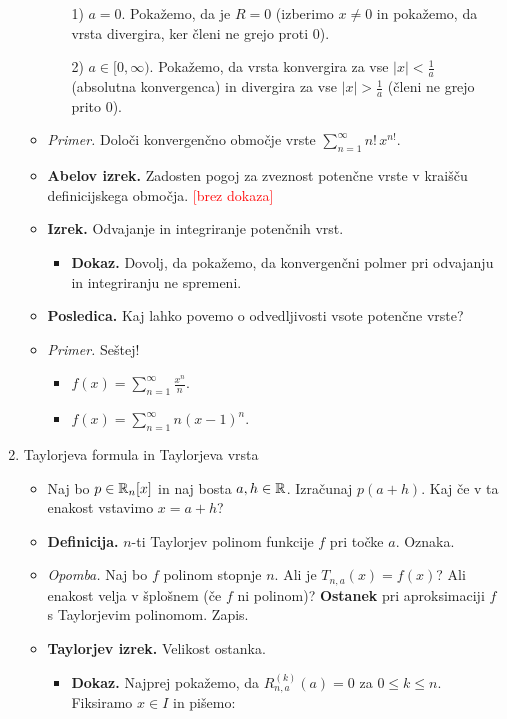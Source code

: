 \begin{enumerate}
\begin{itemize}
\begin{itemize}
            1) $a = 0$. Pokažemo, da je $R = 0$ (izberimo $x \neq 0$ in pokažemo, da vrsta divergira, ker členi ne grejo proti $0$).

            2) $a \in [0, \infty)$. Pokažemo, da vrsta konvergira za vse $|x| < \frac{1}{a}$ (absolutna konvergenca) in divergira za vse $|x| > \frac{1}{a}$ (členi ne grejo prito $0$).
        \end{itemize} 
        \item \colorbox{yellow!30}{\emph{Primer.}} Določi konvergenčno območje vrste $\sum_{n=1}^{\infty} n! \, x^{n!}$.
        \item \colorbox{blue!30}{\textbf{Abelov izrek.}}  Zadosten pogoj za zveznost potenčne vrste v kraišču definicijskega območja. \textcolor{red}{[brez dokaza]}
        \item \colorbox{blue!30}{\textbf{Izrek.}} Odvajanje in integriranje potenčnih vrst.
        \begin{itemize}
            \item \colorbox{green!30}{\textbf{Dokaz.}} Dovolj, da pokažemo, da konvergenčni polmer pri odvajanju in integriranju ne spremeni.
        \end{itemize} 
        \item \colorbox{orange!30}{\textbf{Posledica.}} Kaj lahko povemo o odvedljivosti vsote potenčne vrste?
        \item \colorbox{yellow!30}{\emph{Primer.}} Seštej!
        \begin{itemize}
            \item $f(x) = \sum_{n=1}^{\infty} \frac{x^n}{n}$.
            \item $f(x) = \sum_{n=1}^{\infty} n(x-1)^n$.
        \end{itemize}
    \end{itemize}
    
    \item Taylorjeva formula in Taylorjeva vrsta
    \begin{itemize}
        \item Naj bo $p \in \mathbb{R}_n[x]$ in naj bosta $a, h \in \mathbb{R}$. Izračunaj $p(a+h)$. Kaj če v ta enakost vstavimo $x = a + h$? 
        \item \colorbox{purple!30}{\textbf{Definicija.}} $n$-ti Taylorjev polinom funkcije $f$ pri točke $a$. Oznaka.        
        \item \colorbox{yellow!30}{\emph{Opomba.}} Naj bo $f$ polinom stopnje $n$. Ali je $T_{n,a}(x) = f(x)$? Ali enakost velja v šplošnem (če $f$ ni polinom)? \textbf{Ostanek} pri aproksimaciji $f$ s Taylorjevim polinomom. Zapis.        
        \item \colorbox{blue!30}{\textbf{Taylorjev izrek.}} Velikost ostanka.
        \begin{itemize}
            \item \colorbox{green!30}{\textbf{Dokaz.}} Najprej pokažemo, da $R_{n,a}^{(k)}(a) = 0$ za $0 \leq k \leq n$. Fiksiramo $x \in I$ in pišemo: 
            

\end{itemize}
\end{itemize}
\end{enumerate}
